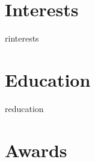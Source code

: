 \documentclass[letterpaper]{twentysecondcv} %
\begin{document}






\makeprofile %


\section{Interests}

rinterests


\section{Education}

\begin{twenty} %
	reducation
\end{twenty}


\section{Awards}
\end{document}
